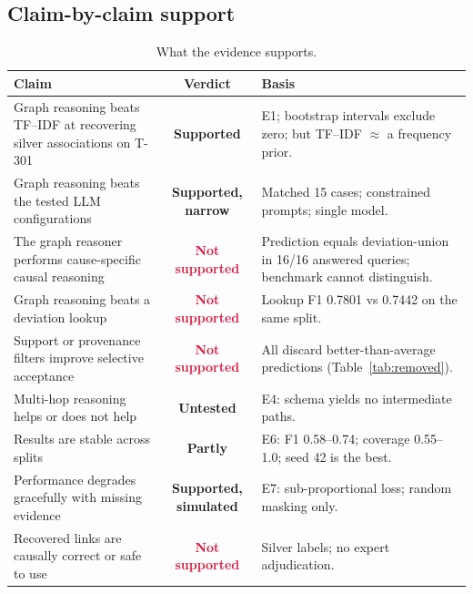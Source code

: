 \documentclass[10pt,twocolumn,a4paper]{extarticle}
\begin{document}
\subsection{Claim-by-claim support}\label{sec:claims}

\begin{table}[t]
\centering
\caption{What the evidence supports.}
\label{tab:claims}
\begin{tabularx}{\textwidth}{@{}>{\raggedright\arraybackslash}X c >{\raggedright\arraybackslash}X@{}}
\toprule
\textbf{Claim} & \textbf{Verdict} & \textbf{Basis}\\
\midrule
Graph reasoning beats TF--IDF at recovering silver associations on T-301 & \textcolor{okgreen}{\textbf{Supported}} & E1; bootstrap intervals exclude zero; but TF--IDF $\approx$ a frequency prior.\\
Graph reasoning beats the tested LLM configurations & \textcolor{okgreen}{\textbf{Supported, narrow}} & Matched 15 cases; constrained prompts; single model.\\
The graph reasoner performs cause-specific causal reasoning & \textcolor{crimson}{\textbf{Not supported}} & Prediction equals deviation-union in 16/16 answered queries; benchmark cannot distinguish.\\
Graph reasoning beats a deviation lookup & \textcolor{crimson}{\textbf{Not supported}} & Lookup F1 0.7801 vs 0.7442 on the same split.\\
Support or provenance filters improve selective acceptance & \textcolor{crimson}{\textbf{Not supported}} & All discard better-than-average predictions (Table~\ref{tab:removed}).\\
Multi-hop reasoning helps or does not help & \textcolor{amber}{\textbf{Untested}} & E4: schema yields no intermediate paths.\\
Results are stable across splits & \textcolor{amber}{\textbf{Partly}} & E6: F1 0.58--0.74; coverage 0.55--1.0; seed 42 is the best.\\
Performance degrades gracefully with missing evidence & \textcolor{okgreen}{\textbf{Supported, simulated}} & E7: sub-proportional loss; random masking only.\\
Recovered links are causally correct or safe to use & \textcolor{crimson}{\textbf{Not supported}} & Silver labels; no expert adjudication.\\
\bottomrule
\end{tabularx}
\end{table}

\end{document}
